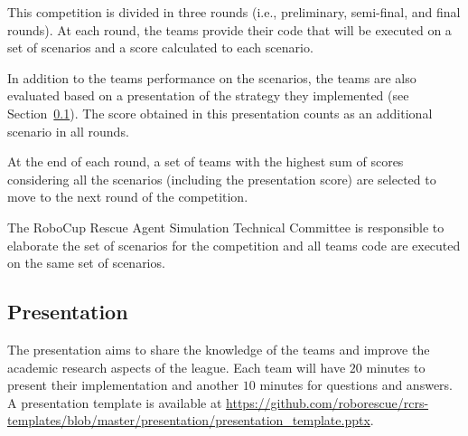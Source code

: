 \documentclass{article}
\begin{document}
This competition is divided in three rounds (i.e., preliminary, semi-final, and 
final rounds). At each round, the teams provide their code that will be 
executed on a set of scenarios and a score calculated to each scenario.

In addition to the teams performance on the scenarios, the teams are also
evaluated based on a presentation of the strategy they implemented (see
Section~\ref{sec:presentation}). The score obtained in this presentation counts
as an additional scenario in all rounds.

At the end of each round, a set of teams with the highest sum of scores
considering all the scenarios (including the presentation score) are selected to
move to the next round of the competition.

The RoboCup Rescue Agent Simulation Technical Committee is responsible to 
elaborate the set of scenarios for the competition and all teams code are
executed on the same set of scenarios.
\subsection{Presentation}
\label{sec:presentation}
The presentation aims to share the knowledge of the teams and improve the 
academic research aspects of the league. Each team will have $20$ minutes to 
present their implementation and another $10$ minutes for questions and answers.
A presentation template is available at
\url{https://github.com/roborescue/rcrs-templates/blob/master/presentation/presentation_template.pptx}.
\end{document}
